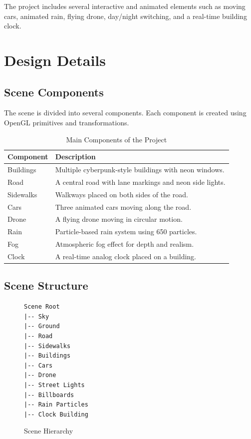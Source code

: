 \documentclass[12pt,a4paper]{report}
\begin{document}
The project includes several interactive and animated elements such as moving cars, animated rain, flying drone, day/night switching, and a real-time building clock.

\chapter{Design Details}

\section{Scene Components}

The scene is divided into several components. Each component is created using OpenGL primitives and transformations.

\begin{table}[H]
\centering
\renewcommand{\arraystretch}{1.3}
\begin{tabular}{|p{4cm}|p{9cm}|}
\hline
\textbf{Component} & \textbf{Description} \\
\hline
Buildings & Multiple cyberpunk-style buildings with neon windows. \\
\hline
Road & A central road with lane markings and neon side lights. \\
\hline
Sidewalks & Walkways placed on both sides of the road. \\
\hline
Cars & Three animated cars moving along the road. \\
\hline
Drone & A flying drone moving in circular motion. \\
\hline
Rain & Particle-based rain system using 650 particles. \\
\hline
Fog & Atmospheric fog effect for depth and realism. \\
\hline
Clock & A real-time analog clock placed on a building. \\
\hline
\end{tabular}
\caption{Main Components of the Project}
\end{table}

\section{Scene Structure}

\begin{figure}[H]
\centering
\begin{verbatim}
Scene Root
|-- Sky
|-- Ground
|-- Road
|-- Sidewalks
|-- Buildings
|-- Cars
|-- Drone
|-- Street Lights
|-- Billboards
|-- Rain Particles
|-- Clock Building
\end{verbatim}
\caption{Scene Hierarchy}
\end{figure}
\end{document}
